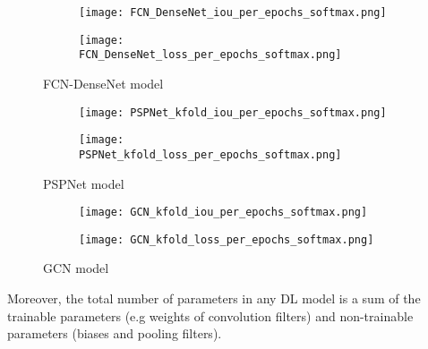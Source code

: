 \begin{figure}[!h]
	\begin{subfigure}[b]{0.47\textwidth}
	\centering
	\texttt{[image: FCN\_DenseNet\_iou\_per\_epochs\_softmax.png]}
	\caption{}
	\label{fig:fcn_densenet_accuracy_metric}
	\end{subfigure}
	\hfill
	\begin{subfigure}[b]{0.47\textwidth}
	\centering
	\texttt{[image: FCN\_DenseNet\_loss\_per\_epochs\_softmax.png]}
	\caption{}
	\label{fig:fcn_densenet_loss_metric}
	\end{subfigure}	
\caption{FCN-DenseNet model}
\label{fig:FCN_DenseNet_iou_loss}
\end{figure}
\begin{figure} [!h]
	\centering
	\begin{subfigure}[b]{0.47\textwidth}
		\centering
		\texttt{[image: PSPNet\_kfold\_iou\_per\_epochs\_softmax.png]}
		\caption{}
		\label{fig:psp_accuracy_metric}
	\end{subfigure}
	\hfill
	\begin{subfigure}[b]{0.47\textwidth}
		\centering
		\texttt{[image: PSPNet\_kfold\_loss\_per\_epochs\_softmax.png]}
	\caption{}
	\label{fig:psp_loss_metric}
	\end{subfigure}
	\caption{PSPNet model}
	\label{fig:PSPNet_iou_loss}
\end{figure}
\begin{figure} [!h]
	\centering
	\begin{subfigure}[b]{0.47\textwidth}
		\centering
		\texttt{[image: GCN\_kfold\_iou\_per\_epochs\_softmax.png]}
		\caption{}
		\label{fig:gcn_accuracy_metric}
	\end{subfigure}
	\hfill
	\begin{subfigure}[b]{0.47\textwidth}
		\centering
		\texttt{[image: GCN\_kfold\_loss\_per\_epochs\_softmax.png]}			
		\caption{}
		\label{fig:gcn_loss_metric}
	\end{subfigure}
	\caption{GCN model}
	\label{fig:GCN_iou_loss}	
\end{figure}
\clearpage
Moreover, the total number of parameters in any DL model is a sum of the trainable parameters (e.g weights of convolution filters) and non-trainable parameters (biases and pooling filters).

